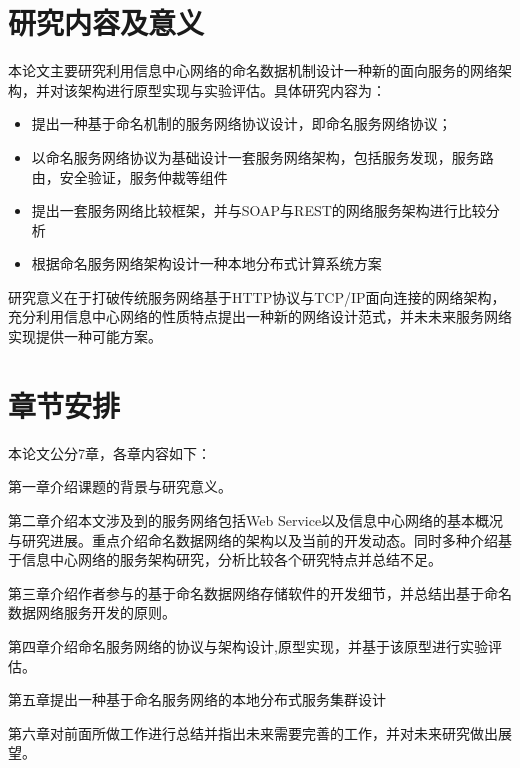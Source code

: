 \section{研究内容及意义}
本论文主要研究利用信息中心网络的命名数据机制设计一种新的面向服务的网络架构，并对该架构进行原型实现与实验评估。具体研究内容为：
\begin{itemize}
\item 提出一种基于命名机制的服务网络协议设计，即命名服务网络协议；
\item 以命名服务网络协议为基础设计一套服务网络架构，包括服务发现，服务路由，安全验证，服务仲裁等组件
\item 提出一套服务网络比较框架，并与SOAP与REST的网络服务架构进行比较分析
\item 根据命名服务网络架构设计一种本地分布式计算系统方案
\end{itemize}
研究意义在于打破传统服务网络基于HTTP协议与TCP/IP面向连接的网络架构，充分利用信息中心网络的性质特点提出一种新的网络设计范式，并未未来服务网络实现提供一种可能方案。
\section{章节安排}
本论文公分7章，各章内容如下：

第一章介绍课题的背景与研究意义。

第二章介绍本文涉及到的服务网络包括Web Service以及信息中心网络的基本概况与研究进展。重点介绍命名数据网络的架构以及当前的开发动态。同时多种介绍基于信息中心网络的服务架构研究，分析比较各个研究特点并总结不足。

第三章介绍作者参与的基于命名数据网络存储软件的开发细节，并总结出基于命名数据网络服务开发的原则。

第四章介绍命名服务网络的协议与架构设计,原型实现，并基于该原型进行实验评估。

第五章提出一种基于命名服务网络的本地分布式服务集群设计

第六章对前面所做工作进行总结并指出未来需要完善的工作，并对未来研究做出展望。

